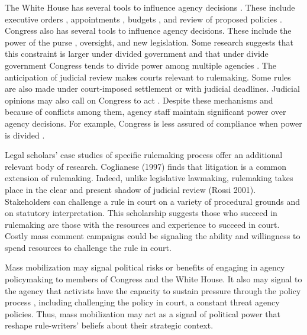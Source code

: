 The White House has several tools to influence agency decisions \citep{Yackee2009RegGov,Simon1954}. These include executive orders \citep{Mayer1999}, appointments \citep{Doherty2014,Lewis2008,Wood1988}, budgets \citep{Whittington2003}, and review of proposed policies \citep{Haeder2015, Acs2013}. 
Congress also has several tools to influence agency decisions. These include the power of the purse \citep{Fenno1986,Bolton2015}, oversight, and new legislation. Some research suggests that this constraint is larger under divided government \citep{Yackee2009RegGov} %
and that under divide government Congress tends to divide power among multiple agencies \citep{Farhang2016}.
The anticipation of judicial review makes courts relevant to rulemaking. Some rules are also made under court-imposed settlement or with judicial deadlines. Judicial opinions may also call on Congress to act \citep{Yaver2017}.
Despite these mechanisms and because of conflicts among them, agency staff maintain significant power over agency decisions. For example, Congress is less assured of compliance when power is divided \citep{Yaver2016}.

Legal scholars' case studies of specific rulemaking process offer an additional relevant body of research. Coglianese (1997) finds that litigation is a common extension of rulemaking. Indeed, unlike legislative lawmaking, rulemaking takes place in the clear and present shadow of judicial review (Rossi 2001). Stakeholders can challenge a rule in court on a variety of procedural grounds and on statutory interpretation. This scholarship suggests those who succeed in rulemaking are those with the resources and experience to succeed in court. Costly mass comment campaigns could be signaling the ability and willingness to spend resources to challenge the rule in court. 

Mass mobilization may signal political risks or benefits of engaging in agency policymaking to members of Congress and the White House. It also may signal to the agency that activists have the capacity to sustain pressure through the policy process \citep{Coglianese2001}, including challenging the policy in court, a constant threat agency policies. Thus, mass mobilization may act as a signal of political power that  reshape rule-writers' beliefs about their strategic context. 


